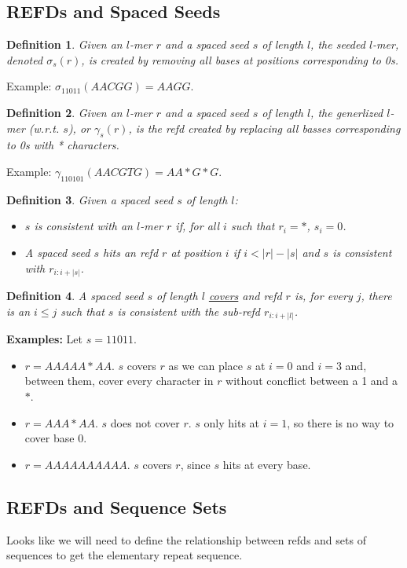 \documentclass{article}
\newtheorem{definition}{Definition}
\begin{document}
\subsection{REFDs and Spaced Seeds}


\begin{definition}
Given an $l$-mer $r$ and a spaced seed $s$ of length $l$, the seeded
$l$-mer, denoted $\sigma_s(r)$, is created by removing all bases at
positions corresponding to 0s.
\end{definition}
Example: $\sigma_{11011}(AACGG) = AAGG$. 

\begin{definition}
Given an $l$-mer $r$ and a spaced seed $s$ of length $l$, the
generlized $l$-mer (w.r.t. $s$), or $\gamma_s(r)$, is the refd created by replacing
all basses corresponding to 0s with * characters.
\end{definition}
Example: $\gamma_{110101}(AACGTG) = AA*G*G$.

\begin{definition}
Given a spaced seed $s$ of length $l$: 
\begin{itemize}
\item $s$ is {\it consistent} with an $l$-mer $r$ if, for all
$i$ such that $r_i = *$, $s_i = 0$.  
\item A spaced seed $s$ hits an refd $r$ at position $i$ if 
  $i <|r|-|s|$ and $s$ is consistent with $r_{i:i+|s|}$.
\end{itemize}
\end{definition}

\begin{definition} 
A spaced seed $s$ of length $l$ \underline{covers} and refd $r$ is, for every $j$,
there is an $i \leq j$ such that $s$ is consistent with the sub-refd
$r_{i:i+|l|}$.
\end{definition}
{\bf Examples:} Let $s = 11011$.
\begin{itemize}
\item $r = AAAAA*AA$. $s$ covers $r$ as we can place $s$ at $i=0$ and
  $i=3$ and, between them, cover every character in $r$ without
  concflict between a 1 and a $*$.
\item $r = AAA*AA$.  $s$ does not cover $r$.  $s$ only hits at $i=1$,
  so there is no way to cover base 0.
\item $r = AAAAAAAAAA$.  $s$ covers $r$, since $s$ hits at every base.
\end{itemize}

\subsection{REFDs and Sequence Sets}
Looks like we will need to define the relationship between refds and
sets of sequences to get the elementary repeat sequence.
\end{document}

